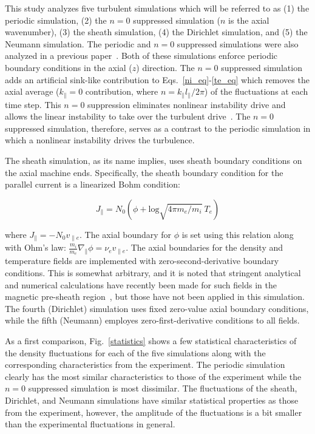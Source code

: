 \documentclass[showpacs,preprintnumbers,amsmath,amssymb,superscriptaddress,aip]{revtex4-1}
\def\beq{\begin{equation}}
\def\eeq{\end{equation}}
\def\para{\parallel}
\def\grad{\nabla}
\newcommand{\gradpar}{\grad_\parallel}
\newcommand{\vpe}{v_{\parallel e}}
\newcommand{\nue}{\nu_{e}}
\newcommand{\fmie}{\frac{m_i}{m_e}}
\begin{document}
This study analyzes five turbulent simulations which will be referred to as (1) the periodic simulation, (2) the $n=0$ suppressed simulation ($n$ is the axial wavenumber), 
(3) the sheath simulation, (4) the Dirichlet simulation,
and (5) the Neumann simulation.
The periodic and $n=0$ suppressed simulations were also analyzed in a previous paper~\cite{friedman2012b}. Both of these simulations enforce periodic boundary conditions in the axial ($z$)
direction. The $n=0$ suppressed simulation adds an artificial sink-like contribution to Eqs.~\ref{ni_eq}-\ref{te_eq} which removes the axial average 
($k_\parallel = 0$ contribution, where $n = k_\para l_\para /2 \pi$) of the fluctuations at each time step. This $n=0$ suppression eliminates nonlinear instability drive and allows
the linear instability to take over the turbulent drive~\cite{friedman2012b}. The $n=0$ suppressed simulation, therefore, serves as a contrast to the periodic simulation in which a nonlinear instability
drives the turbulence.
  
The sheath simulation, as its name implies, uses sheath boundary conditions on the axial machine ends. Specifically, the sheath boundary
condition for the parallel current is a linearized Bohm condition:

\beq
\label{sheath_bndry}
J_\para = N_0 (\phi + \text{log} \sqrt{4 \pi m_e/m_i} \ T_e) 
\eeq

where $J_\para = - N_0 \vpe$. The axial boundary for $\phi$ is set using this relation along with Ohm's law: $ \fmie \gradpar \phi = \nue \vpe$. 
The axial boundaries for the density and temperature fields are implemented with zero-second-derivative boundary conditions. This is somewhat arbitrary, and it is noted
that stringent analytical and numerical calculations have recently been made for such fields in the magnetic pre-sheath region~\cite{loizu2012}, but those have not been applied in this simulation.
The fourth (Dirichlet) simulation uses fixed zero-value axial boundary conditions, while the fifth (Neumann) employes zero-first-derivative conditions to all fields.

As a first comparison, Fig.~\ref{statistics} shows a few statistical characteristics of the density fluctuations for each of the five simulations along with the corresponding
characteristics from the experiment. The periodic simulation clearly has the most similar characteristics to those of the experiment while the $n=0$ suppressed simulation is most dissimilar.
The fluctuations of the sheath, Dirichlet, and Neumann simulations have similar statistical properties as those from the experiment, however, 
the amplitude of the fluctuations is a bit smaller than the experimental fluctuations in general.
\end{document}
